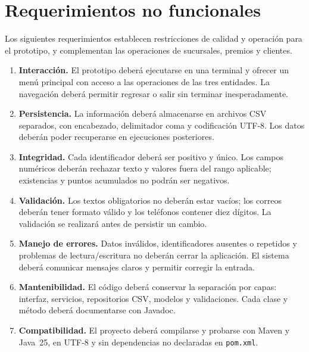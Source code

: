 \section{Requerimientos no funcionales}
Los siguientes requerimientos establecen restricciones de calidad y operación
para el prototipo, y complementan las operaciones de sucursales, premios y
clientes.

\begin{enumerate}[label=\textbf{RNF-\arabic*.}, leftmargin=*]
    \item \textbf{Interacción.} El prototipo deberá ejecutarse en una terminal y
    ofrecer un menú principal con acceso a las operaciones de las tres entidades.
    La navegación deberá permitir regresar o salir sin terminar inesperadamente.
    \item \textbf{Persistencia.} La información deberá almacenarse en archivos
    CSV separados, con encabezado, delimitador coma y codificación UTF-8. Los
    datos deberán poder recuperarse en ejecuciones posteriores.
    \item \textbf{Integridad.} Cada identificador deberá ser positivo y único.
    Los campos numéricos deberán rechazar texto y valores fuera del rango
    aplicable; existencias y puntos acumulados no podrán ser negativos.
    \item \textbf{Validación.} Los textos obligatorios no deberán estar vacíos;
    los correos deberán tener formato válido y los teléfonos contener diez
    dígitos. La validación se realizará antes de persistir un cambio.
    \item \textbf{Manejo de errores.} Datos inválidos, identificadores ausentes o
    repetidos y problemas de lectura/escritura no deberán cerrar la aplicación.
    El sistema deberá comunicar mensajes claros y permitir corregir la entrada.
    \item \textbf{Mantenibilidad.} El código deberá conservar la separación por
    capas: interfaz, servicios, repositorios CSV, modelos y validaciones. Cada
    clase y método deberá documentarse con Javadoc.
    \item \textbf{Compatibilidad.} El proyecto deberá compilarse y probarse con
    Maven y Java~25, en UTF-8 y sin dependencias no declaradas en \texttt{pom.xml}.
\end{enumerate}
